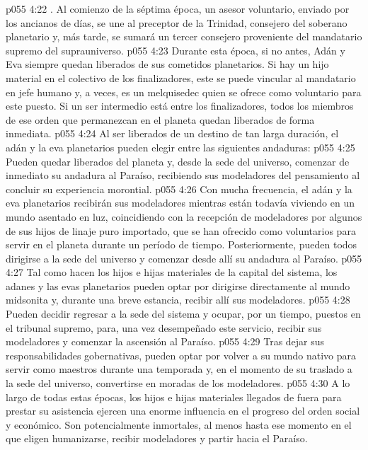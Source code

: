 \vs p055 4:22 . Al comienzo de la séptima época, un asesor voluntario, enviado por los ancianos de días, se une al preceptor de la Trinidad, consejero del soberano planetario y, más tarde, se sumará un tercer consejero proveniente del mandatario supremo del suprauniverso.
\vs p055 4:23 Durante esta época, si no antes, Adán y Eva siempre quedan liberados de sus cometidos planetarios. Si hay un hijo material en el colectivo de los finalizadores, este se puede vincular al mandatario en jefe humano y, a veces, es un melquisedec quien se ofrece como voluntario para este puesto. Si un ser intermedio está entre los finalizadores, todos los miembros de ese orden que permanezcan en el planeta quedan liberados de forma inmediata.
\vs p055 4:24 \pc Al ser liberados de un destino de tan larga duración, el adán y la eva planetarios pueden elegir entre las siguientes andaduras:
\vs p055 4:25 Pueden quedar liberados del planeta y, desde la sede del universo, comenzar de inmediato su andadura al Paraíso, recibiendo sus modeladores del pensamiento al concluir su experiencia morontial.
\vs p055 4:26 Con mucha frecuencia, el adán y la eva planetarios recibirán sus modeladores mientras están todavía viviendo en un mundo asentado en luz, coincidiendo con la recepción de modeladores por algunos de sus hijos de linaje puro importado, que se han ofrecido como voluntarios para servir en el planeta durante un período de tiempo. Posteriormente, pueden todos dirigirse a la sede del universo y comenzar desde allí su andadura al Paraíso.
\vs p055 4:27 Tal como hacen los hijos e hijas materiales de la capital del sistema, los adanes y las evas planetarios pueden optar por dirigirse directamente al mundo midsonita y, durante una breve estancia, recibir allí sus modeladores.
\vs p055 4:28 Pueden decidir regresar a la sede del sistema y ocupar, por un tiempo, puestos en el tribunal supremo, para, una vez desempeñado este servicio, recibir sus modeladores y comenzar la ascensión al Paraíso.
\vs p055 4:29 Tras dejar sus responsabilidades gobernativas, pueden optar por volver a su mundo nativo para servir como maestros durante una temporada y, en el momento de su traslado a la sede del universo, convertirse en moradas de los modeladores.
\vs p055 4:30 \pc A lo largo de todas estas épocas, los hijos e hijas materiales llegados de fuera para prestar su asistencia ejercen una enorme influencia en el progreso del orden social y económico. Son potencialmente inmortales, al menos hasta ese momento en el que eligen humanizarse, recibir modeladores y partir hacia el Paraíso.
